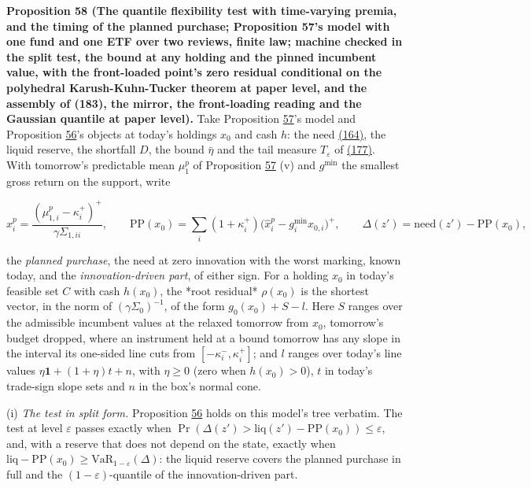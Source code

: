 \documentclass[11pt]{article}
\begin{document}
\label{res:Proposition-58}
\textbf{Proposition 58 (The quantile flexibility test with time-varying premia, and the timing of the planned purchase; Proposition 57's model with one fund and one ETF over two reviews, finite law; machine checked in the split test, the bound at any holding and the pinned incumbent value, with the front-loaded point's zero residual conditional on the polyhedral Karush-Kuhn-Tucker theorem at paper level, and the assembly of (183), the mirror, the front-loading reading and the Gaussian quantile at paper level).}
Take Proposition \hyperref[res:Proposition-57]{57}'s model and Proposition \hyperref[res:Proposition-56]{56}'s objects at today's
holdings \(x_0\) and cash \(h\): the need \hyperref[eq:164]{(164)}, the liquid reserve, the
shortfall \(D\), the bound \(\bar\eta\) and the tail measure \(T_\varepsilon\) of \hyperref[eq:177]{(177)}. With
tomorrow's predictable mean \(\mu^p_1\) of Proposition \hyperref[res:Proposition-57]{57} (v) and \(g^{\min}\) the
smallest gross return on the support, write

\begin{equation*}
\hat x^p_i=\frac{(\mu^p_{1,i}-\kappa^+_i)^+}{\gamma\Sigma_{1,ii}},\qquad
\mathrm{PP}(x_0)=\sum_i(1+\kappa^+_i)\bigl(\hat x^p_i-g^{\min}_ix_{0,i}\bigr)^+,\qquad
\Delta(z')=\mathrm{need}(z')-\mathrm{PP}(x_0),\tag{181}\label{eq:181}
\end{equation*}

the \emph{planned purchase}, the need at zero innovation with the worst
marking, known today, and the \emph{innovation-driven part}, of either sign.
For a holding \(x_0\) in today's feasible set \(C\) with cash \(h(x_0)\), the *root
residual* \(\rho(x_0)\) is the shortest vector, in the norm of \((\gamma\Sigma_0)^{-1}\), of
the form \(g_0(x_0)+S-l\). Here \(S\) ranges over the admissible incumbent
values at the relaxed tomorrow from \(x_0\), tomorrow's budget dropped,
where an instrument held at a bound tomorrow has any slope in the
interval its one-sided line cuts from \([-\kappa^-_i,\kappa^+_i]\); and \(l\) ranges over
today's line values \(\eta\mathbf 1+(1+\eta)t+n\), with \(\eta\geq0\) (zero when \(h(x_0)>0\)), \(t\) in
today's trade-sign slope sets and \(n\) in the box's normal cone.

(i) \emph{The test in split form.} Proposition \hyperref[res:Proposition-56]{56} holds on this model's tree
verbatim. The test at level \(\varepsilon\) passes exactly when
\(\Pr(\Delta(z')>\mathrm{liq}(z')-\mathrm{PP}(x_0))\leq\varepsilon\), and, with a reserve that does not depend on
the state, exactly when \(\mathrm{liq}-\mathrm{PP}(x_0)\geq\mathrm{VaR}_{1-\varepsilon}(\Delta)\): the liquid reserve
covers the planned purchase in full and the \((1-\varepsilon)\)-quantile of the
innovation-driven part.
\end{document}
